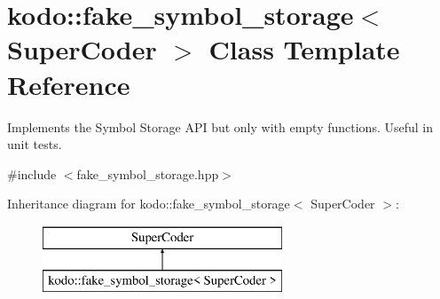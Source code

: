 \hypertarget{classkodo_1_1fake__symbol__storage}{\section{kodo\-:\-:fake\-\_\-symbol\-\_\-storage$<$ Super\-Coder $>$ Class Template Reference}
\label{classkodo_1_1fake__symbol__storage}
}


Implements the Symbol Storage A\-P\-I but only with empty functions. Useful in unit tests.  




{\ttfamily \#include $<$fake\-\_\-symbol\-\_\-storage.\-hpp$>$}

Inheritance diagram for kodo\-:\-:fake\-\_\-symbol\-\_\-storage$<$ Super\-Coder $>$\-:\begin{figure}[H]
\begin{center}
\leavevmode
\includegraphics[height=2.000000cm]{classkodo_1_1fake__symbol__storage}
\end{center}
\end{figure}

